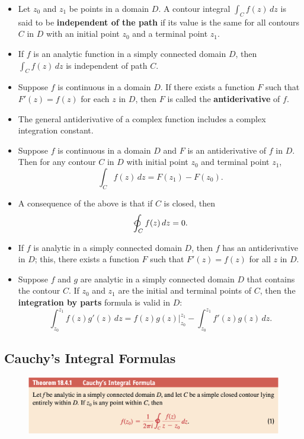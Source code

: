 \documentclass{article}
\begin{document}
\begin{itemize}
  \item Let $z_0$ and $z_1$ be points in a domain $D$. A contour integral $\int_C f(z) \,d z$ is said to be \textbf{independent of the path} if its value is the same for all contours $C$ in $D$ with an initial point $z_0$ and a terminal point $z_1$.

  \item If $f$ is an analytic function in a simply connected domain $D$, then \\ $\int_C f(z) \,d z$ is independent of path $C$.

  \item Suppose $f$ is continuous in a domain $D$. If there exists a function $F$ such that $F'(z) = f(z)$ for each $z$ in $D$, then $F$ is called the \textbf{antiderivative} of $f$.

  \item The general antiderivative of a complex function includes a complex integration constant.

  \item Suppose $f$ is continuous in a domain $D$ and $F$ is an antiderivative of $f$ in $D$. Then for any contour $C$ in $D$ with initial point $z_0$ and terminal point $z_1$, \[\int_C f(z) \,d z = F(z_1) - F(z_0).\]

  \item A consequence of the above is that if $C$ is closed, then \[\varointctrclockwise_C f(z) \,d z = 0.\]

  \item If $f$ is analytic in a simply connected domain $D$, then $f$ has an antiderivative in $D$; this, there exists a function $F$ such that $F'(z) = f(z)$ for all $z$ in $D$.

  \item Suppose $f$ and $g$ are analytic in a simply connected domain $D$ that contains the contour $C$. If $z_0$ and $z_1$ are the initial and terminal points of $C$, then the \textbf{integration by parts} formula is valid in $D$: \[\int_{z_0}^{z_1} f(z) g'(z) \,d z = f(z) g(z)|_{z_0}^{z_1} - \int_{z_0}^{z_1} f'(z) g(z) \,d z.\]
\end{itemize}

\subsection{Cauchy's Integral Formulas}

\begin{figure}[H]
  \centering
  \includegraphics[width=\textwidth]{cauchys-integral-formula}
\end{figure}
\end{document}
